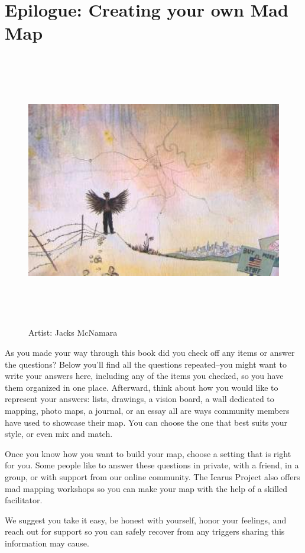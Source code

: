 \chapter*{Epilogue:
	Creating your own Mad Map}

\begin{figure}[h]
\centering
\includegraphics[height=12cm]{TeX_files/5-0.png}
\caption{Artist: Jacks McNamara}
\label{2-0}
\end{figure}


As you made your way through this book did you check off any items or answer the questions? Below you’ll find all the questions repeated--you might want to write your answers here, including any of the items you checked, so you have them organized in one place. Afterward, think about how you would like to represent your answers: lists, drawings, a vision board, a wall dedicated to mapping, photo maps, a journal, or an essay all are ways community members have used to showcase their map. You can choose the one that best suits your style, or even mix and match.

Once you know how you want to build your map, choose a setting that is right for you. Some people like to answer these questions in private, with a friend, in a group, or with support from our online community. The Icarus Project also offers mad mapping workshops so you can make your map with the help of a skilled facilitator.

We suggest you take it easy, be honest with yourself, honor your feelings, and reach out for support so you can safely recover from any triggers sharing this information may cause.

